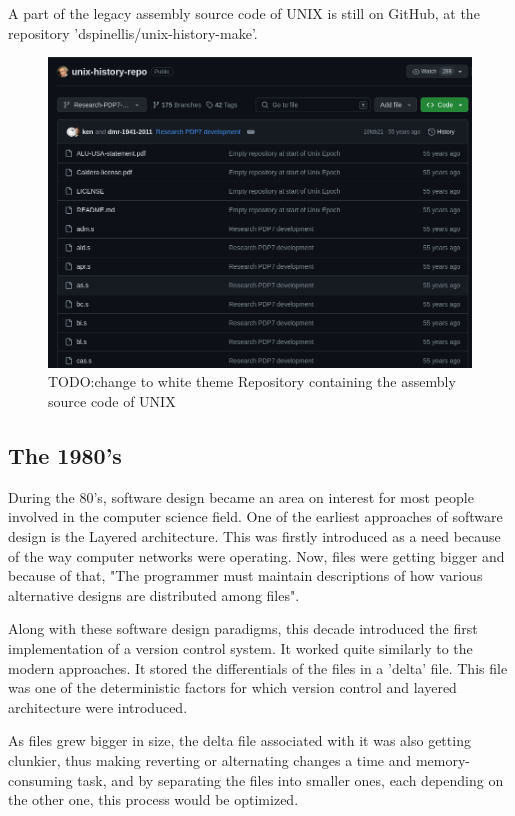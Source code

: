 A part of the legacy assembly source code of UNIX is still on GitHub, at the repository 'dspinellis/unix-history-make'.
\begin{figure}[htbp]
    \centering
    \includegraphics[scale=0.5]{pictures/unix_repo.png}
    \caption{TODO:change to white theme Repository containing the assembly source code of UNIX}
    \label{unixRepo}
\end{figure}

\subsection{The 1980's}
During the 80's, software design became an area on interest for most people involved in the computer science field.
One of the earliest approaches of software design is the Layered architecture.
This was firstly introduced as a need because of the way computer networks were operating.
Now, files were getting bigger and because of that, "The programmer must maintain descriptions of
how various alternative designs are distributed among files"\cite{layeredArchitecure80s}.

\par

Along with these software design paradigms, this decade introduced the first implementation of a version control system.
It worked quite similarly to the modern approaches.
It stored the differentials of the files in a 'delta' file\cite{layeredArchitecure80s}.
This file was one of the deterministic factors for which version control and layered architecture were introduced.

As files grew bigger in size, the delta file associated with it was also getting clunkier, thus making reverting or alternating changes a time and memory-consuming task, and by separating the files into smaller ones, each depending on the other one, this process would be optimized.

